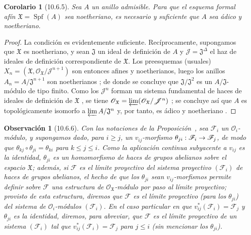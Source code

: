 \documentclass[oneside]{amsart}
\theoremstyle{ega-env-style}
\theoremstyle{ega-thm-env-style}
\newtheorem*{corollary}{Corolario}
\theoremstyle{ega-defn-env-style}
\newtheorem*{remark}{Observación}
\def\leq{\leqslant}                 %
\def\geq{\geqslant}                 %
\renewcommand{\to}{\mathchoice{\longrightarrow}{\rightarrow}{\rightarrow}{\rightarrow}}
\let\EGAOriginalLabel\label
\renewcommand{\label}[1]{\phantomsection\EGAOriginalLabel{#1}}
\begin{document}
\begin{corollary}[10.6.5]
\label{I.10.6.5}
Sea $A$ un anillo admisible.
Para que el esquema formal afín $\mathfrak{X}=\operatorname{Spf}(A)$ sea noetheriano, es necesario y suficiente que $A$ sea ádico y noetheriano.
\end{corollary}

\begin{proof}
La condición es evidentemente suficiente.
Recíprocamente, supongamos que $\mathfrak{X}$ es noetheriano, y sean $\mathfrak{J}$ un ideal de definición de $A$ y $\mathscr{J}=\mathfrak{J}^\Delta$ el haz de ideales de definición correspondiente de $\mathfrak{X}$.
Los preesquemas (usuales) $X_n=(\mathfrak{X},
\mathscr{O}_{\mathfrak{X}}/\mathscr{J}^{n+1})$ son entonces afines y noetherianos, luego los anillos $A_n=A/\mathfrak{J}^{n+1}$ son noetherianos ; de donde se concluye que $\mathfrak{J}/\mathfrak{J}^2$ es un $A/\mathfrak{J}$-módulo de tipo finito.
Como los $\mathscr{J}^n$ forman un sistema fundamental de haces de ideales de definición de $\mathfrak{X}$ , se tiene $\mathscr{O}_{\mathfrak{X}}
=\varprojlim(\mathscr{O}_{\mathfrak{X}}/\mathscr{J}^n)$ ; se concluye así  que $A$ es topológicamente isomorfo a $\varprojlim A/\mathfrak{J}^n$ y, por tanto, es ádico y noetheriano .
\end{proof}

\begin{remark}[10.6.6]
\label{I.10.6.6}
Con las notaciones de la Proposición~, sea $\mathscr{F}_i$ un $\mathscr{O}_i$-módulo, y supongamos dado, para $i\geq j$, un $v_{ij}$-morfismo $\theta_{ji}:\mathscr{F}_i\to\mathscr{F}_j$, de modo que $\theta_{kj}\circ\theta_{ji}=\theta_{ki}$ para $k\leq j\leq i$.
Como la aplicación continua subyacente a $v_{ij}$ es la identidad, $\theta_{ji}$ es un homomorfismo de haces de grupos abelianos sobre el espacio $\mathfrak{X}$; además, si $\mathscr{F}$ es el límite proyectivo del sistema proyectivo $(\mathscr{F}_i)$ de haces de grupos abelianos, el hecho de que los $\theta_{ji}$ sean $v_{ij}$-morfismos permite definir sobre $\mathscr{F}$ una estructura de $\mathscr{O}_{\mathfrak{X}}$-módulo por paso al límite proyectivo; provisto de esta estructura, diremos que $\mathscr{F}$ es el \emph{límite proyectivo} (para los $\theta_{ji}$) del sistema de $\mathscr{O}_i$-módulos $(\mathscr{F}_i)$.
En el caso particular en que $v_{ij}^*(\mathscr{F}_i)=\mathscr{F}_j$ y $\theta_{ji}$ es la \emph{identidad}, diremos, para abreviar, que $\mathscr{F}$ es el límite proyectivo de un sistema $(\mathscr{F}_i)$ tal que $v_{ij}^*(\mathscr{F}_i)=\mathscr{F}_j$ para $j\leq i$ (sin mencionar los $\theta_{ji}$).
\end{remark}
\end{document}
